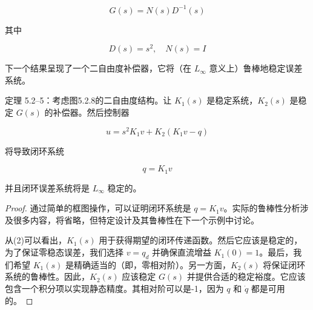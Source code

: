 \documentclass[UTF8,12pt,a4paper]{ctexart}
\begin{document}
\begin{equation}
G(s) = N(s)D^{-1}(s)
\end{equation}

其中

\begin{equation}\label{eq:5.2.37}
D(s) = s^2, \quad N(s) = I
\end{equation}

下一个结果呈现了一个二自由度补偿器，它将（在 $L_\infty$ 意义上）鲁棒地稳定误差系统。

\begin{theorem}\label{thm:5.2.5}
定理 5.2--5：考虑图5.2.8的二自由度结构。让 $K_1(s)$ 是稳定系统，$K_2(s)$ 是稳定 $G(s)$ 的补偿器。然后控制器

\begin{equation}
u = s^2K_1v + K_2(K_1v - q)
\end{equation}

将导致闭环系统

\begin{equation}
q = K_1v
\end{equation}

并且闭环误差系统将是 $L_\infty$ 稳定的。
\end{theorem}

\begin{proof}
通过简单的框图操作，可以证明闭环系统是 $q = K_1v$。实际的鲁棒性分析涉及很多内容，将省略，但特定设计及其鲁棒性在下一个示例中讨论。

从(2)可以看出，$K_1(s)$ 用于获得期望的闭环传递函数。然后它应该是稳定的，为了保证零稳态误差，我们选择 $v = q_d$ 并确保直流增益 $K_1(0) = 1$。最后，我们希望 $K_1(s)$ 是精确适当的（即，零相对阶）。另一方面，$K_2(s)$ 将保证闭环系统的鲁棒性。因此，$K_2(s)$ 应该稳定 $G(s)$ 并提供合适的稳定裕度。它应该包含一个积分项以实现静态精度。其相对阶可以是-1，因为 $q$ 和 $\dot{q}$ 都是可用的。
\end{proof}
\end{document}
